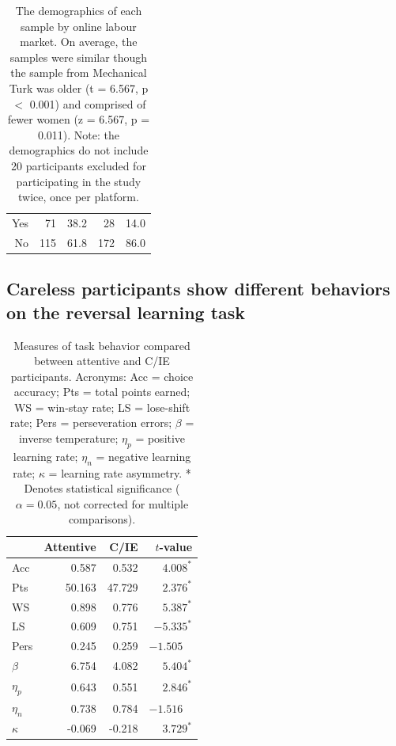 \documentclass[a4paper,notitlepage,12pt]{article}
\begin{document}
\begin{refsection}[supp]
\begin{table}[!h]
\begin{tabular}{ rrrrr }
Yes            &      71 &  38.2 &       28 &  14.0 \\
No             &     115 &  61.8 &      172 &  86.0 \\
\bottomrule
\end{tabular}
\captionsetup{width=0.88\textwidth}
\caption{The demographics of each sample by online labour market. On average, the samples were similar though the sample from Mechanical Turk was older (t = 6.567, p $<$ 0.001) and comprised of fewer women (z = 6.567, p = 0.011). Note: the demographics do not include 20 participants excluded for participating in the study twice, once per platform.}
\label{tab:demographics}
\end{table}

\clearpage

\subsection*{Careless participants show different behaviors on the reversal learning task}

\begin{table}[H]
\centering
\begin{tabular}{lrrr}
\toprule
{} &  Attentive &    C/IE &   $t$-value \\
\midrule
Acc      &      0.587 &   0.532 &  $4.008^*$  \\
Pts      &     50.163 &  47.729 &  $2.376^*$  \\
WS       &      0.898 &   0.776 &  $5.387^*$  \\
LS       &      0.609 &   0.751 &  $-5.335^*$ \\
Pers     &      0.245 &   0.259 &  $-1.505$ \ \\
$\beta$  &      6.754 &   4.082 &  $5.404^*$  \\
$\eta_p$ &      0.643 &   0.551 &  $2.846^*$  \\
$\eta_n$ &      0.738 &   0.784 & $-1.516$ \  \\
$\kappa$ &     -0.069 &  -0.218 &  $3.729^*$  \\
\bottomrule
\end{tabular}
\captionsetup{width=0.88\textwidth}
\caption{Measures of task behavior compared between attentive and C/IE participants. Acronyms: Acc = choice accuracy; Pts = total points earned; WS = win-stay rate; LS = lose-shift rate; Pers = perseveration errors; $\beta$ = inverse temperature; $\eta_p$ = positive learning rate; $\eta_n$ = negative learning rate; $\kappa$ = learning rate asymmetry. * Denotes statistical significance ($\alpha=0.05$, not corrected for multiple comparisons).}
\end{table}


\end{refsection}
\end{document}
